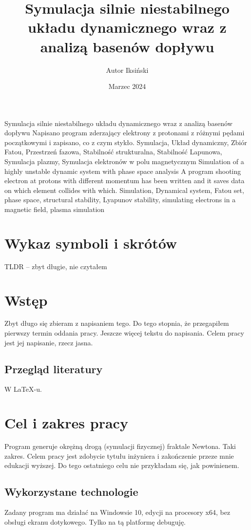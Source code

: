 \documentclass{SGGW-thesis}
\title{Symulacja silnie niestabilnego układu dynamicznego wraz z analizą basenów dopływu}
\author{Autor Iksiński}
\date{Marzec 2024}
\begin{document}
\maketitle
\statementpage
\abstractpage
{Symulacja silnie niestabilnego układu dynamicznego wraz z analizą basenów dopływu}
{Napisano program zderzający elektrony z protonami z różnymi pędami początkowymi i zapisano, co z czym stykło.}
{Symulacja, Układ dynamiczny, Zbiór Fatou, Przestrzeń fazowa, Stabilność strukturalna, Stabilność Lapunowa, Symulacja plazmy, Symulacja elektronów w polu magnetycznym}
{Simulation of a highly unstable dynamic system with phase space analysis}
{A program shooting electron at protons with different momentum has been written and it saves data on which element collides with which.}
{Simulation, Dynamical system, Fatou set, phase space, structural stability, Lyapunov stability, simulating electrons in a magnetic field, plasma simulation}

{
  \doublespacing
  \tableofcontents
}

\startchapterfromoddpage %

\chapter{Wykaz symboli i skrótów}
TLDR -- zbyt długie, nie czytałem

\chapter{Wstęp}
Zbyt długo się zbieram z napisaniem tego. Do tego stopnia, że przegapiłem pierwszy termin oddania pracy. Jeszcze więcej tekstu do napisania. Celem pracy jest jej napisanie, rzecz jasna.

\section{Przegląd literatury}
W \LaTeX-u.\cite{talbot2013}

\chapter{Cel i zakres pracy}
Program generuje okrężną drogą (symulacji fizycznej) fraktale Newtona. Taki zakres. Celem pracy jest zdobycie tytułu inżyniera i zakończenie przeze mnie edukacji wyższej. Do tego ostatniego celu nie przykładam się, jak powinienem.
\section{Wykorzystane technologie}
Zadany program ma działać na Windowsie 10, edycji na procesory x64, bez obsługi ekranu dotykowego. Tylko na tą platformę debuguję.
\end{document}
